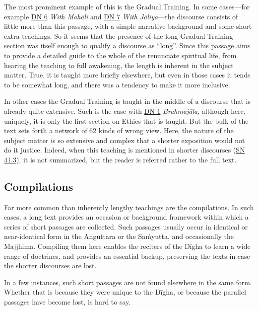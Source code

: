 \documentclass[12pt,openany]{book}%
\begin{document}
The most prominent example of this is the Gradual Training. In some cases—for example \href{https://suttacentral.net/dn6}{DN 6} \textit{With \textsanskrit{Mahāli}} and \href{https://suttacentral.net/dn7}{DN 7} \textit{With \textsanskrit{Jāliya}}—the discourse consists of little more than this passage, with a simple narrative background and some short extra teachings. So it seems that the presence of the long Gradual Training section was itself enough to qualify a discourse as “long”. Since this passage aims to provide a detailed guide to the whole of the renunciate spiritual life, from hearing the teaching to full awakening, the length is inherent in the subject matter. True, it is taught more briefly elsewhere, but even in those cases it tends to be somewhat long, and there was a tendency to make it more inclusive.

In other cases the Gradual Training is taught in the middle of a discourse that is already quite extensive. Such is the case with \href{https://suttacentral.net/dn1}{DN 1} \textit{\textsanskrit{Brahmajāla}}, although here, uniquely, it is only the first section on Ethics that is taught. But the bulk of the text sets forth a network of 62 kinds of wrong view. Here, the nature of the subject matter is so extensive and complex that a shorter exposition would not do it justice. Indeed, when this teaching is mentioned in shorter discourses (\href{https://suttacentral.net/sn41.3}{SN 41.3}), it is not summarized, but the reader is referred rather to the full text.

\subsection*{Compilations}

Far more common than inherently lengthy teachings are the compilations. In such cases, a long text provides an occasion or background framework within which a series of short passages are collected. Such passages usually occur in identical or near-identical form in the \textsanskrit{Aṅguttara} or the \textsanskrit{Saṁyutta}, and occasionally the Majjhima. Compiling them here enables the reciters of the \textsanskrit{Dīgha} to learn a wide range of doctrines, and provides an essential backup, preserving the texts in case the shorter discourses are lost.

In a few instances, such short passages are not found elsewhere in the same form. Whether that is because they were unique to the \textsanskrit{Dīgha}, or because the parallel passages have become lost, is hard to say.
\end{document}
